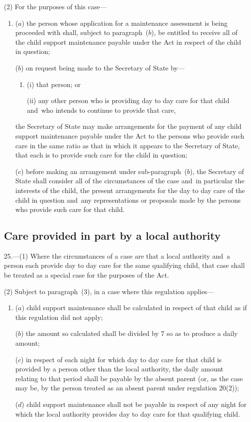 \documentclass[12pt,a4paper]{article}
\begin{document}
(2) For the purposes of this case—
\begin{enumerate}\item[]
($a$) the person whose application for a maintenance assessment is being proceeded with shall, subject to paragraph~($b$), be entitled to receive all of the child support maintenance payable under the Act in respect of the child in question;

($b$) on request being made to the Secretary of State by—
\begin{enumerate}\item[]
(i) that person; or

(ii) any other person who is providing day to day care for that child and~who intends to continue to provide that care,
\end{enumerate}
the Secretary of State may make arrangements for the payment of any child support maintenance payable under the Act to the persons who provide such care in the same ratio as that in which it appears to the Secretary of State, that each is to provide such care for the child in question;

($c$) before making an arrangement under sub-paragraph~($b$), the Secretary of State shall consider all of the circumstances of the case and~in particular the interests of the child, the present arrangements for the day to day care of the child in question and~any representations or proposals made by the persons who provide such care for that child.
\end{enumerate}

\subsection[25. Care provided in part by a local authority]{Care provided in part by a local authority}

25.—(1) Where the circumstances of a case are that a local authority and~a person each provide day to day care for the same qualifying child, that case shall be treated as a special case for the purposes of the Act.

(2) 
Subject to paragraph~(3), in a case where this regulation applies---  %
\begin{enumerate}\item[]
($a$) child support maintenance shall be calculated in respect of that child as if this regulation did not apply;

($b$) the amount so calculated shall be divided by 7 so as to produce a daily amount;

($c$) in respect of each night for which day to day care for that child is provided by a person other than the local authority, the daily amount relating to that period shall be payable by the absent parent (or, as the case may be, by the person treated as an absent parent under regulation 20(2));

($d$) child support maintenance shall not be payable in respect of any night for which the local authority provides day to day care for that qualifying child.
\end{enumerate}
\end{document}
